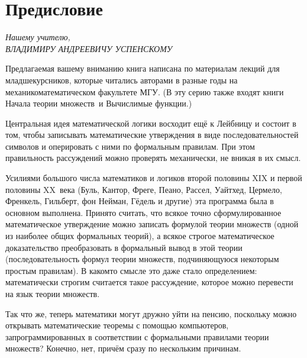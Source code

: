 \chapter*{Предисловие}

\begin{flushright}
\textit{Нашему учителю,}\\[1ex]
\textit{ВЛАДИМИРУ АНДРЕЕВИЧУ УСПЕНСКОМУ}\\[2ex]
\end{flushright}

Предлагаемая вашему вниманию книга написана по материалам лекций
для младшекурсников, которые читались авторами в разные годы на
механико\д математическом факультете МГУ. (В эту серию также
входят книги  Начала теории множеств\ и  Вычислимые
функции.)

Центральная идея математической логики восходит ещё к Лейбницу и
состоит в том, чтобы записывать математические
утверждения в виде последовательностей символов и
оперировать с ними по формальным правилам. При этом правильность
рассуждений можно проверять механически, не вникая в их смысл.

Усилиями большого числа математиков и логиков второй
половины XIX и первой половины XX~века (Буль, Кантор, Фреге,
Пеано, Рассел, Уайтхед, Цермело, Френкель, Гильберт, фон Нейман,
Гёдель и другие) эта программа была в основном выполнена.
Принято считать, что всякое точно сформулированное
математическое ут\-вер\-ж\-де\-ние можно записать формулой теории
множеств (одной из наиболее общих формальных теорий), а всякое
строгое математическое доказательство преобразовать в формальный
вывод в этой теории (последовательность формул теории множеств,
подчиняющуюся некоторым простым правилам). В каком\д то смысле это
даже стало определением: математически строгим считается такое
рассуждение, которое можно перевести на язык теории множеств.

Так что же, теперь математики могут дружно уйти на пенсию,
поскольку можно открывать математические теоремы с помощью
компьютеров, запрограммированных в соответствии с формальными
правилами теории множеств? Конечно, нет, причём сразу по
нескольким причинам.

